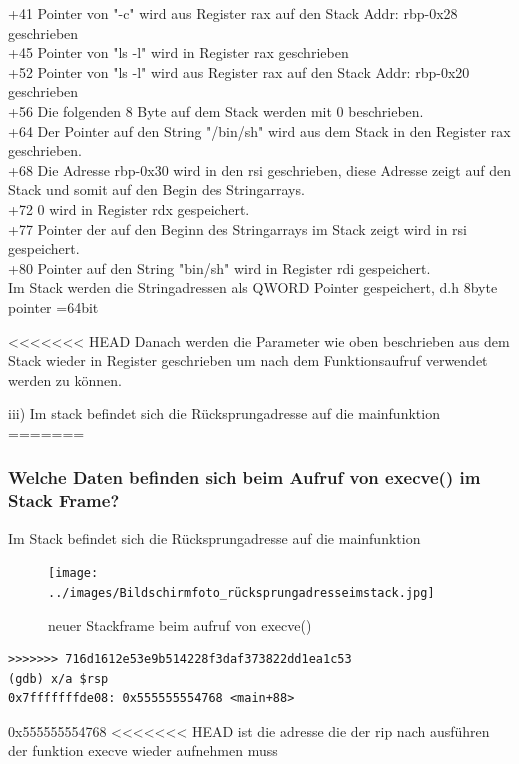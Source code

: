 \documentclass[12pt]{article}
\begin{document}
+41 Pointer von "-c" wird aus Register rax auf den Stack Addr: rbp-0x28 geschrieben\\
+45 Pointer von "ls -l" wird in Register rax geschrieben\\
+52 Pointer von "ls -l" wird aus Register rax auf den Stack Addr: rbp-0x20 geschrieben\\
+56 Die folgenden 8 Byte auf dem Stack werden mit 0 beschrieben.\\
+64 Der Pointer auf den String "/bin/sh" wird aus dem Stack in den Register rax geschrieben.\\
+68 Die Adresse rbp-0x30 wird in den rsi geschrieben, diese Adresse zeigt auf den Stack und somit auf den Begin des Stringarrays.\\
+72	0 wird in Register rdx gespeichert.\\
+77 Pointer der auf den Beginn des Stringarrays im Stack zeigt wird in rsi gespeichert.\\ 
+80 Pointer auf den String "bin/sh" wird in Register rdi gespeichert.\\

Im Stack werden die Stringadressen als QWORD Pointer gespeichert, d.h 8byte pointer =64bit

<<<<<<< HEAD
Danach werden die Parameter wie oben beschrieben aus dem Stack wieder in Register geschrieben 
um nach dem Funktionsaufruf verwendet werden zu k\"onnen.


iii)
Im stack befindet sich die R\"ucksprungadresse auf die mainfunktion
=======


\newpage
\subsubsection{Welche Daten befinden sich beim Aufruf von execve() im Stack Frame?}
Im Stack befindet sich die Rücksprungadresse auf die mainfunktion

\begin{figure}[h!]
	\texttt{[image: ../images/Bildschirmfoto\_rücksprungadresseimstack.jpg]}
	\caption{neuer Stackframe beim aufruf von execve()}
\end{figure}

\begin{lstlisting}
>>>>>>> 716d1612e53e9b514228f3daf373822dd1ea1c53
(gdb) x/a $rsp
0x7fffffffde08:	0x555555554768 <main+88>
\end{lstlisting}
0x555555554768
<<<<<<< HEAD
ist die adresse die der rip nach ausf\"uhren der funktion execve wieder aufnehmen muss
\end{document}
